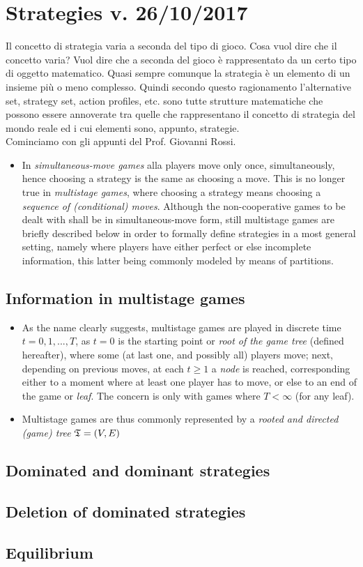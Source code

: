 \chapter{Strategies v. 26/10/2017}
Il concetto di strategia varia a seconda del tipo di gioco. Cosa vuol dire che il concetto varia? Vuol dire che a seconda del gioco \`e rappresentato da un certo tipo di oggetto matematico. 
Quasi sempre comunque la strategia \`e un elemento di un insieme pi\`u o meno complesso. Quindi secondo questo ragionamento l'alternative set, strategy set, action profiles, etc. sono tutte strutture matematiche che possono essere annoverate tra quelle che rappresentano il concetto di strategia del mondo reale ed i cui elementi sono, appunto, strategie. \\

Cominciamo con gli appunti del Prof. Giovanni Rossi.

\begin{itemize}
	\item In \emph{simultaneous-move games} alla players move only once, simultaneously, hence choosing a strategy is the same as choosing a move. This is no longer true in \emph{multistage games}, where choosing a strategy means choosing a \emph{sequence of (conditional) moves}. Although the non-cooperative games to be dealt with shall be in simultaneous-move form, still multistage games are briefly described below in order to formally define strategies in a most general setting, namely where players have either perfect or else incomplete information, this latter being commonly modeled by means of partitions.
\end{itemize}

\section{Information in multistage games}
\begin{itemize}
	\item As the name clearly suggests, multistage games are played in discrete time $t = 0, 1, ..., T$, as $t = 0$ is the starting point or \emph{root of the game tree} (defined hereafter), where some (at last one, and possibly all) players move; next, depending on previous moves, at each $t \ge 1$ a \emph{node} is reached, corresponding either to a moment where at least one player has to move, or else to an end of the game or \emph{leaf}. The concern is only with games where $T < \infty$ (for any leaf).
	
	\item Multistage games are thus commonly represented by a \emph{rooted and directed (game) tree} $\mathfrak{T} = (V, E)$ 
\end{itemize}

\section{Dominated and dominant strategies}
\section{Deletion of dominated strategies}
\section{Equilibrium}